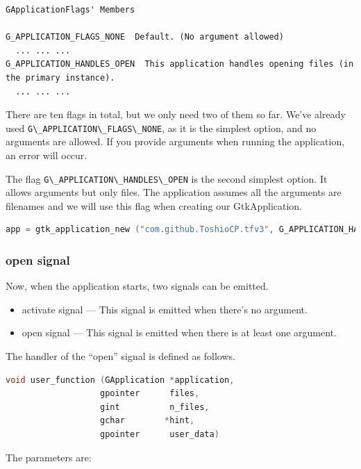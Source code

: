 \begin{lstlisting}
GApplicationFlags' Members

G_APPLICATION_FLAGS_NONE  Default. (No argument allowed)
  ... ... ...
G_APPLICATION_HANDLES_OPEN  This application handles opening files (in the primary instance).
  ... ... ...
\end{lstlisting}

There are ten flags in total, but we only need two of them so far. We've
already used \passthrough{\lstinline!G\_APPLICATION\_FLAGS\_NONE!}, as
it is the simplest option, and no arguments are allowed. If you provide
arguments when running the application, an error will occur.

The flag \passthrough{\lstinline!G\_APPLICATION\_HANDLES\_OPEN!} is the
second simplest option. It allows arguments but only files. The
application assumes all the arguments are filenames and we will use this
flag when creating our GtkApplication.

\begin{lstlisting}[language=C]
app = gtk_application_new ("com.github.ToshioCP.tfv3", G_APPLICATION_HANDLES_OPEN);
\end{lstlisting}

\hypertarget{open-signal-1}{%
\subsubsection{open signal}\label{open-signal-1}}

Now, when the application starts, two signals can be emitted.

\begin{itemize}
\tightlist
\item
  activate signal --- This signal is emitted when there's no argument.
\item
  open signal --- This signal is emitted when there is at least one
  argument.
\end{itemize}

The handler of the ``open'' signal is defined as follows.

\begin{lstlisting}[language=C]
void user_function (GApplication *application,
                   gpointer      files,
                   gint          n_files,
                   gchar        *hint,
                   gpointer      user_data)
\end{lstlisting}

The parameters are:

